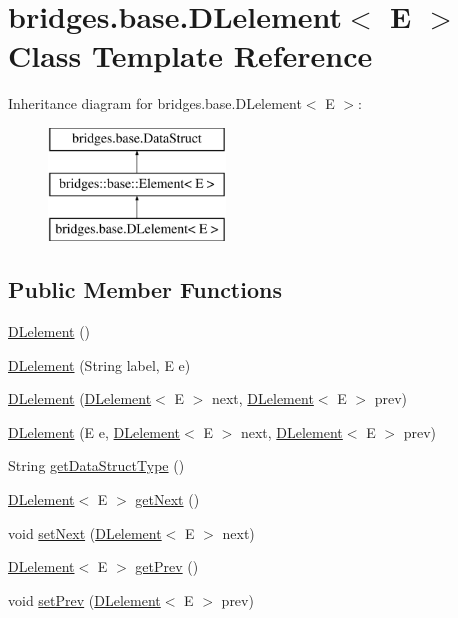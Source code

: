 \hypertarget{classbridges_1_1base_1_1_d_lelement}{}\section{bridges.\+base.\+D\+Lelement$<$ E $>$ Class Template Reference}
\label{classbridges_1_1base_1_1_d_lelement}
Inheritance diagram for bridges.\+base.\+D\+Lelement$<$ E $>$\+:\begin{figure}[H]
\begin{center}
\leavevmode
\includegraphics[height=3.000000cm]{classbridges_1_1base_1_1_d_lelement}
\end{center}
\end{figure}
\subsection*{Public Member Functions}
\begin{DoxyCompactItemize}
\item 
\hyperlink{classbridges_1_1base_1_1_d_lelement_a525b572340e161d9c430baff10b64ab2}{D\+Lelement} ()
\item 
\hyperlink{classbridges_1_1base_1_1_d_lelement_a6aa1d4a3dad4a196c2ed079d108562bc}{D\+Lelement} (String label, E e)
\item 
\hyperlink{classbridges_1_1base_1_1_d_lelement_ab1e4eace66bb1b097463c4f04e964cd0}{D\+Lelement} (\hyperlink{classbridges_1_1base_1_1_d_lelement}{D\+Lelement}$<$ E $>$ next, \hyperlink{classbridges_1_1base_1_1_d_lelement}{D\+Lelement}$<$ E $>$ prev)
\item 
\hyperlink{classbridges_1_1base_1_1_d_lelement_a3ffba30204a2ea6939b07b0ded123af5}{D\+Lelement} (E e, \hyperlink{classbridges_1_1base_1_1_d_lelement}{D\+Lelement}$<$ E $>$ next, \hyperlink{classbridges_1_1base_1_1_d_lelement}{D\+Lelement}$<$ E $>$ prev)
\item 
String \hyperlink{classbridges_1_1base_1_1_d_lelement_a4a0e8f7bd377a652927a741e70aae6d3}{get\+Data\+Struct\+Type} ()
\item 
\hyperlink{classbridges_1_1base_1_1_d_lelement}{D\+Lelement}$<$ E $>$ \hyperlink{classbridges_1_1base_1_1_d_lelement_a35e88e8d991d6f23ec63b3ef3f6cce4e}{get\+Next} ()
\item 
void \hyperlink{classbridges_1_1base_1_1_d_lelement_a1dfea3f7b47901d539aefcba2cd900d9}{set\+Next} (\hyperlink{classbridges_1_1base_1_1_d_lelement}{D\+Lelement}$<$ E $>$ next)
\item 
\hyperlink{classbridges_1_1base_1_1_d_lelement}{D\+Lelement}$<$ E $>$ \hyperlink{classbridges_1_1base_1_1_d_lelement_a859f08f38513ecdfff0eb11bd2b98ce7}{get\+Prev} ()
\item 
void \hyperlink{classbridges_1_1base_1_1_d_lelement_a60b1f5bdaf33ad1dfcc493ebc51939d1}{set\+Prev} (\hyperlink{classbridges_1_1base_1_1_d_lelement}{D\+Lelement}$<$ E $>$ prev)
\end{DoxyCompactItemize}
